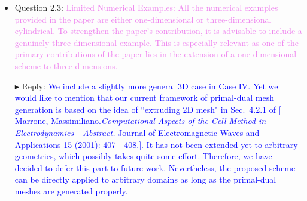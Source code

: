 \documentclass[a4paper, 10pt]{letter}
\begin{document}
\begin{itemize}
  \item Question 2.3: \textcolor{violet}{
  Limited Numerical Examples: All the numerical examples provided in the paper
  are either one-dimensional or three-dimensional cylindrical. To strengthen the paper's contribution,
  it is advisable to include a genuinely three-dimensional example.
  This is especially relevant as one of the primary contributions of the paper lies in the
  extension of a one-dimensional scheme to three dimensions.
  }
  \item[$\blacktriangleright$] Reply: \textcolor{blue}{
  We include a slightly more general 3D case in Case IV. Yet we would like to mention that 
  our current framework of primal-dual mesh generation is based on the idea of
  ``extruding 2D mesh" in Sec.~4.2.1 of
  $[$Marrone, Massimiliano.\emph{Computational Aspects of the Cell Method in Electrodynamics - Abstract.} Journal of Electromagnetic Waves and Applications 15 (2001): 407 - 408.$]$.
  It has not been extended yet to arbitrary geometries, which possibly takes quite some effort.
  Therefore, we have decided to defer this part to future work. Nevertheless,
  the proposed scheme can be directly applied to arbitrary domains
  as long as the primal-dual meshes are generated properly.
  }
\end{itemize}
\end{document}
